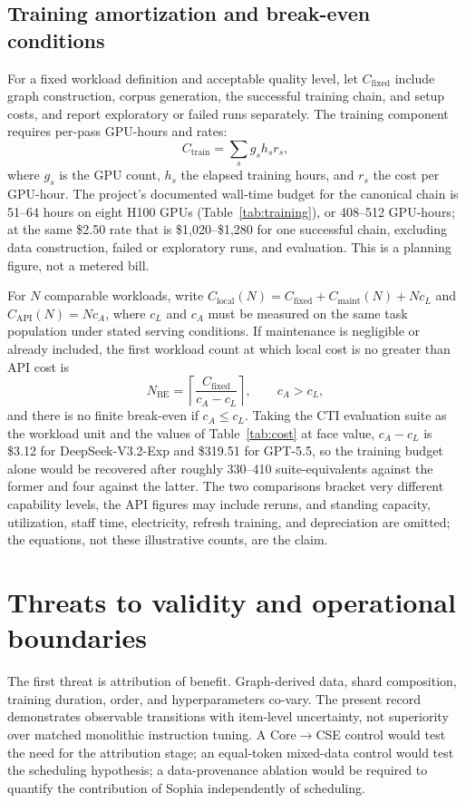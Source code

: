 \documentclass[preprint,12pt,authoryear]{elsarticle}
\begin{document}
\subsection{Training amortization and break-even conditions}
For a fixed workload definition and acceptable quality level, let $C_{\mathrm{fixed}}$ include graph construction, corpus generation, the successful training chain, and setup costs, and report exploratory or failed runs separately. The training component requires per-pass GPU-hours and rates:
\begin{equation}
 C_{\mathrm{train}}=\sum_s g_s h_s r_s,
\end{equation}
where $g_s$ is the GPU count, $h_s$ the elapsed training hours, and $r_s$ the cost per GPU-hour. The project's documented wall-time budget for the canonical chain is 51--64 hours on eight H100 GPUs (Table~\ref{tab:training}), or 408--512 GPU-hours; at the same \$2.50 rate that is \$1,020--\$1,280 for one successful chain, excluding data construction, failed or exploratory runs, and evaluation. This is a planning figure, not a metered bill.

For $N$ comparable workloads, write $C_{\mathrm{local}}(N)=C_{\mathrm{fixed}}+C_{\mathrm{maint}}(N)+Nc_L$ and $C_{\mathrm{API}}(N)=Nc_A$, where $c_L$ and $c_A$ must be measured on the same task population under stated serving conditions. If maintenance is negligible or already included, the first workload count at which local cost is no greater than API cost is
\begin{equation}
 N_{\mathrm{BE}}=\left\lceil\frac{C_{\mathrm{fixed}}}{c_A-c_L}\right\rceil,\qquad c_A>c_L,
\end{equation}
and there is no finite break-even if $c_A\le c_L$. Taking the CTI evaluation suite as the workload unit and the values of Table~\ref{tab:cost} at face value, $c_A-c_L$ is \$3.12 for DeepSeek-V3.2-Exp and \$319.51 for GPT-5.5, so the training budget alone would be recovered after roughly 330--410 suite-equivalents against the former and four against the latter. The two comparisons bracket very different capability levels, the API figures may include reruns, and standing capacity, utilization, staff time, electricity, refresh training, and depreciation are omitted; the equations, not these illustrative counts, are the claim.

\section{Threats to validity and operational boundaries}\label{sec:limits}
The first threat is attribution of benefit. Graph-derived data, shard composition, training duration, order, and hyperparameters co-vary. The present record demonstrates observable transitions with item-level uncertainty, not superiority over matched monolithic instruction tuning. A Core$\rightarrow$CSE control would test the need for the attribution stage; an equal-token mixed-data control would test the scheduling hypothesis; a data-provenance ablation would be required to quantify the contribution of Sophia independently of scheduling.
\end{document}
